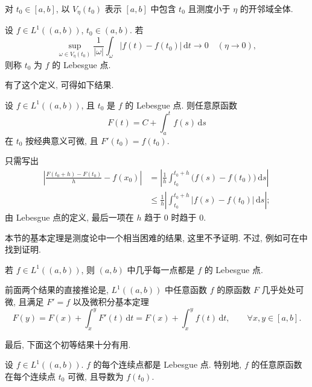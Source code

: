 对 $t_0\in[a,b]$, 以 $V_\eta(t_0)$ 表示 $[a,b]$ 中包含 $t_0$ 且测度小于 $\eta$ 的开邻域全体.

\begin{Definition}
\label{def:chap2-lebesgue-point}
设 $f\in L^1((a,b))$, $t_0\in(a,b)$. 若
\[
 \sup_{\omega\in V_\eta(t_0)}\frac1{|\omega|}
 \int_\omega|f(t)-f(t_0)|\,\mathrm{d}t\longrightarrow0
 \quad(\eta\to0),
\]
则称 $t_0$ 为 $f$ 的 Lebesgue 点.
\end{Definition}

有了这个定义, 可得如下结果.

\begin{Proposition}
\label{prop:chap2-antiderivative-at-lebesgue-point}
设 $f\in L^1((a,b))$, 且 $t_0$ 是 $f$ 的 Lebesgue 点. 则任意原函数
\[
 F(t)=C+\int_a^t f(s)\,\mathrm{d}s
\]
在 $t_0$ 按经典意义可微, 且 $F'(t_0)=f(t_0)$.
\end{Proposition}

\begin{Proof}
只需写出
\begin{align*}
 \left|\frac{F(t_0+h)-F(t_0)}h-f(x_0)\right|
 &=\left|\frac1h\int_{t_0}^{t_0+h}\bigl(f(s)-f(t_0)\bigr)\,\mathrm{d}s\right|\\
 &\leq\frac1h\left|\int_{t_0}^{t_0+h}|f(s)-f(t_0)|\,\mathrm{d}s\right|;
\end{align*}
由 Lebesgue 点的定义, 最后一项在 $h$ 趋于 $0$ 时趋于 $0$.
\end{Proof}

本节的基本定理是测度论中一个相当困难的结果, 这里不予证明. 不过, 例如可在中找到证明.

\begin{Theorem}
\label{thm:chap2-almost-every-point-lebesgue}
若 $f\in L^1((a,b))$, 则 $(a,b)$ 中几乎每一点都是 $f$ 的 Lebesgue 点.
\end{Theorem}

前面两个结果的直接推论是, $L^1((a,b))$ 中任意函数 $f$ 的原函数 $F$ 几乎处处可微, 且满足 $F'=f$ 以及微积分基本定理
\[
 F(y)=F(x)+\int_x^y F'(t)\,\mathrm{d}t
 =F(x)+\int_x^y f(t)\,\mathrm{d}t,
 \qquad\forall x,y\in[a,b].
\]

最后, 下面这个初等结果十分有用.

\begin{Proposition}
\label{prop:chap2-continuity-point-lebesgue}
设 $f\in L^1((a,b))$. $f$ 的每个连续点都是 Lebesgue 点. 特别地, $f$ 的任意原函数在每个连续点 $t_0$ 可微, 且导数为 $f(t_0)$.
\end{Proposition}

